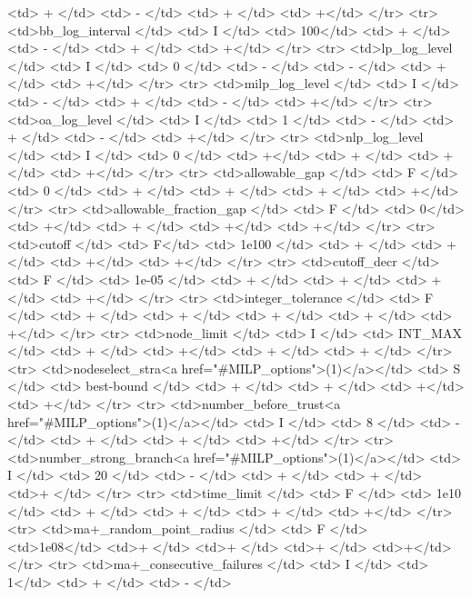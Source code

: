 {\begin{rawhtml}
    <td> + </td>
    <td> - </td>
    <td> + </td>
    <td> +</td>
  </tr>
  <tr>
    <td>bb_log_interval </td>
    <td> I </td>
    <td> 100</td>
    <td> + </td>
    <td> - </td>
    <td> + </td>
    <td> +</td>
  </tr>
  <tr>
    <td>lp_log_level </td>
    <td> I </td>
    <td> 0 </td>
    <td> - </td>
    <td> - </td>
    <td> + </td>
    <td> +</td>
  </tr>
  <tr>
    <td>milp_log_level </td>
    <td> I </td>
    <td> - </td>
    <td> + </td>
    <td> - </td>
    <td> +</td>
  </tr>
  <tr>
    <td>oa_log_level </td>
    <td> I </td>
    <td> 1 </td>
    <td> - </td>
    <td> + </td>
    <td> - </td>
    <td> +</td>
  </tr>
  <tr>
    <td>nlp_log_level </td>
    <td> I </td>
    <td> 0 </td>
    <td> +</td>
    <td> + </td>
    <td> + </td>
    <td> +</td>
  </tr>
  <tr>
    <td>allowable_gap </td>
    <td> F </td>
    <td> 0 </td>
    <td> + </td>
    <td> + </td>
    <td> + </td>
    <td> +</td>
  </tr>
  <tr>
    <td>allowable_fraction_gap </td>
    <td> F </td>
    <td> 0</td>
    <td> +</td>
    <td> + </td>
    <td> +</td>
    <td> +</td>
  </tr>
  <tr>
    <td>cutoff </td>
    <td> F</td>
    <td> 1e100 </td>
    <td> + </td>
    <td> +</td>
    <td> +</td>
    <td> +</td>
  </tr>
  <tr>
    <td>cutoff_decr </td>
    <td> F </td>
    <td> 1e-05 </td>
    <td> + </td>
    <td> + </td>
    <td> + </td>
    <td> +</td>
  </tr>
  <tr>
    <td>integer_tolerance </td>
    <td> F </td>
    <td> + </td>
    <td> + </td>
    <td> + </td>
    <td> + </td>
    <td> +</td>
  </tr>
  <tr>
    <td>node_limit </td>
    <td> I </td>
    <td> INT_MAX </td>
    <td> + </td>
    <td> +</td>
    <td> + </td>
    <td> + </td>
  </tr>
  <tr>
    <td>nodeselect_stra<a href="#MILP_options">(1)</a></td>
    <td> S </td>
    <td> best-bound </td>
    <td> + </td>
    <td> + </td>
    <td> +</td>
    <td> +</td>
  </tr>
  <tr>
    <td>number_before_trust<a href="#MILP_options">(1)</a></td>
    <td> I </td>
    <td> 8 </td>
    <td> - </td>
    <td> + </td>
    <td> + </td>
    <td> +</td>
  </tr>
  <tr>
    <td>number_strong_branch<a href="#MILP_options">(1)</a></td>
    <td> I </td>
    <td> 20 </td>
    <td> - </td>
    <td> + </td>
    <td> + </td>
    <td>+ </td>
  </tr>
  <tr>
    <td>time_limit </td>
    <td> F </td>
    <td> 1e10 </td>
    <td> + </td>
    <td> + </td>
    <td> + </td>
    <td> +</td>
  </tr>
  <tr>
    <td>ma+_random_point_radius </td>
    <td> F </td>
    <td>1e08</td>
    <td>+ </td>
    <td>+ </td>
    <td>+ </td>
    <td>+</td>
  </tr>
  <tr>
    <td>ma+_consecutive_failures </td>
    <td> I </td>
    <td> 1</td>
    <td> + </td>
    <td> - </td>

\end{rawhtml}}
